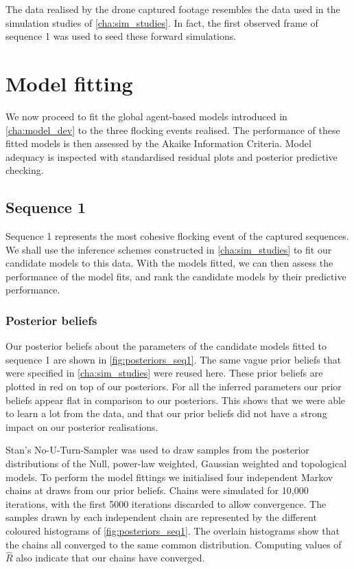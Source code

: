 The data realised by the drone captured footage resembles the data used in the
simulation studies of \cref{cha:sim_studies}. In fact, the first observed frame
of sequence 1 was used to seed these forward simulations.
    
\section{Model fitting}

We now proceed to fit the global agent-based models introduced in
\cref{cha:model_dev} to the three flocking events realised. The performance of
these fitted models is then assessed by the Akaike Information Criteria. Model
adequacy is inspected with standardised residual plots and posterior predictive
checking.

\subsection{Sequence 1}

Sequence 1 represents the most cohesive flocking event of the captured
sequences. We shall use the inference schemes constructed in
\cref{cha:sim_studies} to fit our candidate models to this data. With the
models fitted, we can then assess the performance of the model fits, and rank
the candidate models by their predictive performance.

\subsubsection{Posterior beliefs}

Our posterior beliefs about the parameters of the candidate models fitted to
sequence 1 are shown in \cref{fig:posteriors_seq1}. The same vague prior
beliefs that were specified in \cref{cha:sim_studies} were reused here. These
prior beliefs are plotted in red on top of our posteriors. For all the inferred
parameters our prior beliefs appear flat in comparison to our posteriors. This
shows that we were able to learn a lot from the data, and that our prior
beliefs did not have a strong impact on our posterior realisations.

Stan's No-U-Turn-Sampler was used to draw samples from the posterior
distributions of the Null, power-law weighted, Gaussian weighted and
topological models. To perform the model fittings we initialised four
independent Markov chains at draws from our prior beliefs. Chains were
simulated for 10,000 iterations, with the first 5000 iterations discarded
to allow convergence. The samples drawn by each independent chain are
represented by the different coloured histograms of \cref{fig:posteriors_seq1}.
The overlain histograms show that the chains all converged to the same common
distribution. Computing values of $\widehat{R}$ also indicate that our chains
have converged.

